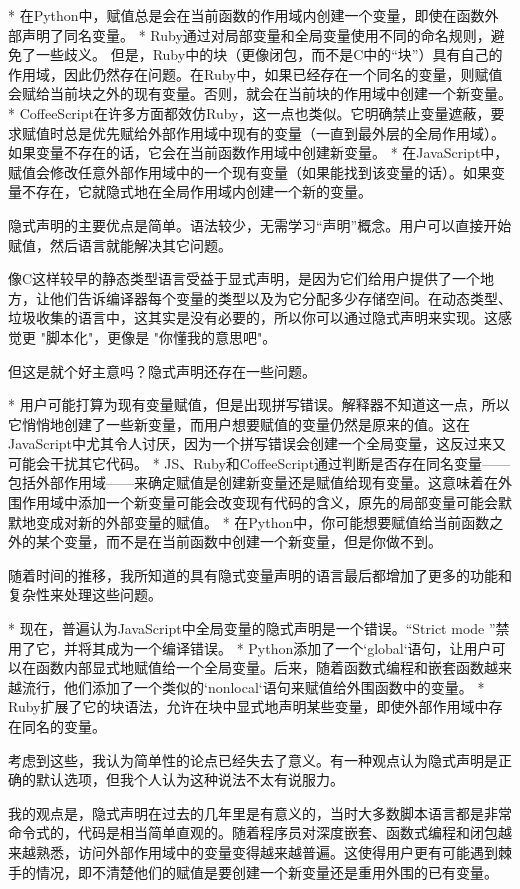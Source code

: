 \documentclass[cn,11pt,chinese]{elegantbook}
\begin{document}
{* 在Python中，赋值总是会在当前函数的作用域内创建一个变量，即使在函数外部声明了同名变量。
* Ruby通过对局部变量和全局变量使用不同的命名规则，避免了一些歧义。 但是，Ruby中的块（更像闭包，而不是C中的“块”）具有自己的作用域，因此仍然存在问题。在Ruby中，如果已经存在一个同名的变量，则赋值会赋给当前块之外的现有变量。否则，就会在当前块的作用域中创建一个新变量。
* CoffeeScript在许多方面都效仿Ruby，这一点也类似。它明确禁止变量遮蔽，要求赋值时总是优先赋给外部作用域中现有的变量（一直到最外层的全局作用域）。如果变量不存在的话，它会在当前函数作用域中创建新变量。
* 在JavaScript中，赋值会修改任意外部作用域中的一个现有变量（如果能找到该变量的话）。如果变量不存在，它就隐式地在全局作用域内创建一个新的变量。

隐式声明的主要优点是简单。语法较少，无需学习“声明”概念。用户可以直接开始赋值，然后语言就能解决其它问题。

像C这样较早的静态类型语言受益于显式声明，是因为它们给用户提供了一个地方，让他们告诉编译器每个变量的类型以及为它分配多少存储空间。在动态类型、垃圾收集的语言中，这其实是没有必要的，所以你可以通过隐式声明来实现。这感觉更 "脚本化"，更像是 "你懂我的意思吧"。

但这是就个好主意吗？隐式声明还存在一些问题。

* 用户可能打算为现有变量赋值，但是出现拼写错误。解释器不知道这一点，所以它悄悄地创建了一些新变量，而用户想要赋值的变量仍然是原来的值。这在JavaScript中尤其令人讨厌，因为一个拼写错误会创建一个全局变量，这反过来又可能会干扰其它代码。
* JS、Ruby和CoffeeScript通过判断是否存在同名变量——包括外部作用域——来确定赋值是创建新变量还是赋值给现有变量。这意味着在外围作用域中添加一个新变量可能会改变现有代码的含义，原先的局部变量可能会默默地变成对新的外部变量的赋值。
* 在Python中，你可能想要赋值给当前函数之外的某个变量，而不是在当前函数中创建一个新变量，但是你做不到。

随着时间的推移，我所知道的具有隐式变量声明的语言最后都增加了更多的功能和复杂性来处理这些问题。

* 现在，普遍认为JavaScript中全局变量的隐式声明是一个错误。“Strict mode ”禁用了它，并将其成为一个编译错误。
* Python添加了一个`global`语句，让用户可以在函数内部显式地赋值给一个全局变量。后来，随着函数式编程和嵌套函数越来越流行，他们添加了一个类似的`nonlocal`语句来赋值给外围函数中的变量。
* Ruby扩展了它的块语法，允许在块中显式地声明某些变量，即使外部作用域中存在同名的变量。

考虑到这些，我认为简单性的论点已经失去了意义。有一种观点认为隐式声明是正确的默认选项，但我个人认为这种说法不太有说服力。

我的观点是，隐式声明在过去的几年里是有意义的，当时大多数脚本语言都是非常命令式的，代码是相当简单直观的。随着程序员对深度嵌套、函数式编程和闭包越来越熟悉，访问外部作用域中的变量变得越来越普遍。这使得用户更有可能遇到棘手的情况，即不清楚他们的赋值是要创建一个新变量还是重用外围的已有变量。

}
\end{document}
